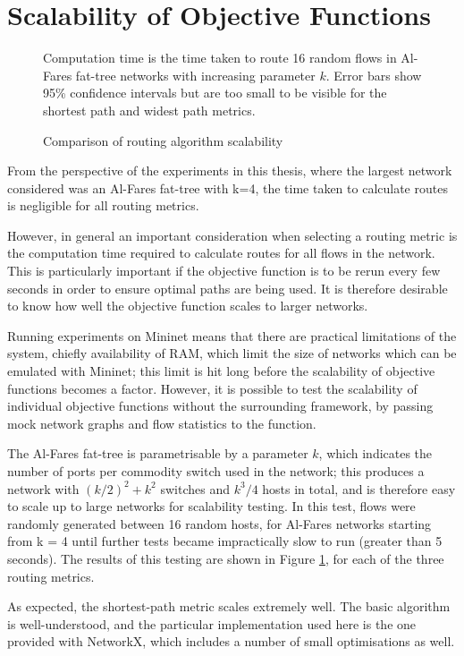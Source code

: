 \section{Scalability of Objective Functions}

\begin{figure}
\centering

\caption{Comparison of routing algorithm scalability}
\label{fig:sca1}
Computation time is the time taken to route 16 random flows in Al-Fares fat-tree networks with increasing parameter $k$. Error bars show 95\% confidence intervals but are too small to be visible for the shortest path and widest path metrics. 
\end{figure}

From the perspective of the experiments in this thesis, where the largest network considered was an Al-Fares fat-tree with k=4, the time taken to calculate routes is negligible for all routing metrics.

However, in general an important consideration when selecting a routing metric is the computation time required to calculate routes for all flows in the network. This is particularly important if the objective function is to be rerun every few seconds in order to ensure optimal paths are being used. It is therefore desirable to know how well the objective function scales to larger networks.

Running experiments on Mininet means that there are practical limitations of the system, chiefly availability of RAM, which limit the size of networks which can be emulated with Mininet; this limit is hit long before the scalability of objective functions becomes a factor. However, it is possible to test the scalability of individual objective functions without the surrounding framework, by passing mock network graphs and flow statistics to the function. 

The Al-Fares fat-tree is parametrisable by a parameter $k$, which indicates the number of ports per commodity switch used in the network; this produces a network with $(k/2)^2+k^2$ switches and $k^3/4$ hosts in total, and is therefore easy to scale up to large networks for scalability testing. In this test, flows were randomly generated between 16 random hosts, for Al-Fares networks starting from k = 4 until further tests became impractically slow to run (greater than 5 seconds).  The results of this testing are shown in Figure \ref{fig:sca1}, for each of the three routing metrics.

As expected, the shortest-path metric scales extremely well. The basic algorithm is well-understood, and the particular implementation used here is the one provided with NetworkX, which includes a number of small optimisations as well.

